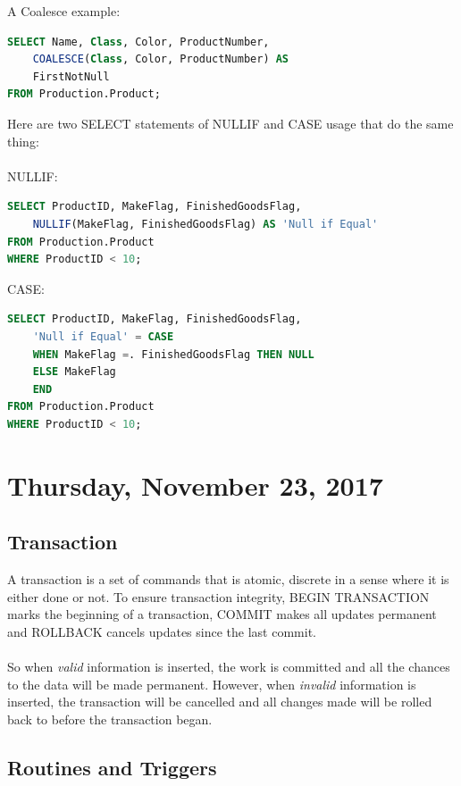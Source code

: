 \documentclass[12pt]{article}
\begin{document}
A Coalesce example:\\
\begin{lstlisting}[language=SQL]
SELECT Name, Class, Color, ProductNumber,
	COALESCE(Class, Color, ProductNumber) AS
	FirstNotNull
FROM Production.Product;
\end{lstlisting}

Here are two SELECT statements of NULLIF and CASE usage that do the same thing:\\
\\
NULLIF:
\begin{lstlisting}[language=SQL]
SELECT ProductID, MakeFlag, FinishedGoodsFlag,
	NULLIF(MakeFlag, FinishedGoodsFlag) AS 'Null if Equal'
FROM Production.Product
WHERE ProductID < 10;
\end{lstlisting}

CASE:
\begin{lstlisting}[language=SQL]
SELECT ProductID, MakeFlag, FinishedGoodsFlag,
	'Null if Equal' = CASE
	WHEN MakeFlag =. FinishedGoodsFlag THEN NULL
	ELSE MakeFlag
	END
FROM Production.Product
WHERE ProductID < 10;
\end{lstlisting}

\newpage

\section{Thursday, November 23, 2017}

\subsection{Transaction}

A transaction is a set of commands that is atomic, discrete in a sense where it is either done or not. To ensure transaction integrity, BEGIN TRANSACTION marks the beginning of a transaction, COMMIT makes all updates permanent and ROLLBACK cancels updates since the last commit.\\
\\
So when \textit{valid} information is inserted, the work is committed and all the chances to the data will be made permanent. However, when \textit{invalid} information is inserted, the transaction will be cancelled and all changes made will be rolled back to before the transaction began.

\subsection{Routines and Triggers}
\end{document}
